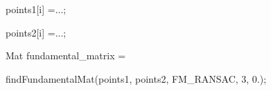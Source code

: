 {\ttfamily }

{\ttfamily }

{\ttfamily points1\mbox{[}i\mbox{]} =...;}

{\ttfamily }

{\ttfamily }

{\ttfamily points2\mbox{[}i\mbox{]} =...;}

{\ttfamily }

{\ttfamily }

{\ttfamily Mat fundamental\+\_\+matrix =}

{\ttfamily }

{\ttfamily }

{\ttfamily find\+Fundamental\+Mat(points1, points2, F\+M\+\_\+\+R\+A\+N\+S\+AC, 3, 0.);}

{\ttfamily }

